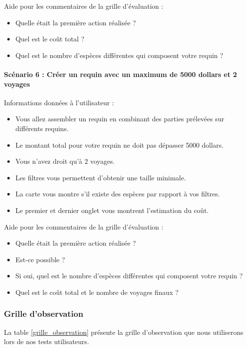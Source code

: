 \documentclass{article}
\begin{document}
Aide pour les commentaires de la grille d'évaluation :
\begin{itemize}
	\item Quelle était la première action réalisée ?
	\item Quel est le coût total ?
	\item Quel est le nombre d'espèces différentes qui composent votre requin ?
\end{itemize}

\paragraph{Scénario 6 : Créer un requin avec un maximum de 5000 dollars et 2 voyages}

Informations données à l'utilisateur :
\begin{itemize}
	\item Vous allez assembler un requin en combinant des parties prélevées sur différents requins.
	\item Le montant total pour votre requin ne doit pas dépasser 5000 dollars.
	\item Vous n'avez droit qu'à 2 voyages.
	\item Les filtres vous permettent d'obtenir une taille minimale.
	\item La carte vous montre s'il existe des espèces par rapport à vos filtres.
	\item Le premier et dernier onglet vous montrent l'estimation du coût.
\end{itemize}

Aide pour les commentaires de la grille d'évaluation :
\begin{itemize}
	\item Quelle était la première action réalisée ?
	\item Est-ce possible ?
	\item Si oui, quel est le nombre d'espèces différentes qui composent votre requin ?
	\item Quel est le coût total et le nombre de voyages finaux ?
\end{itemize}

\subsubsection{Grille d'observation}

La table \ref{grille_observation} présente la grille d'observation que nous utiliserons lors de nos tests utilisateurs.
\end{document}
